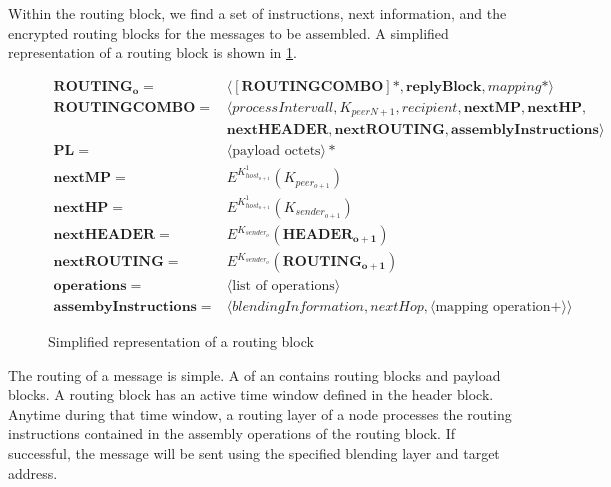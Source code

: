 Within the routing block, we find a set of instructions, next \VortexNodes{} information, and the encrypted routing blocks for the messages to be assembled. A simplified representation of a routing block is shown in \cref{fig:mathRoutingSimplified}.

\begin{figure}[!ht]
	\begin{align}
		\mathbf{ROUTING_o}           = & \langle [ \mathbf{ROUTINGCOMBO} ] *, \mathbf{replyBlock},mapping* \rangle\\  
		\mathbf{ROUTINGCOMBO}        = & \langle processIntervall, K_{peerN+1}, recipient, \mathbf{nextMP}, \mathbf{nextHP}, \nonumber \\
		& \mathbf{nextHEADER}, \mathbf{nextROUTING}, \mathbf{assemblyInstructions} \rangle\\
		\mathbf{PL}                  = & \langle \text{payload octets} \rangle *\\ 
		\mathbf{nextMP}              = & E^{K^1_{host_{o+1}}} \left( K_{peer_{o+1}} \right)\\
		\mathbf{nextHP}              = & E^{K^1_{host_{o+1}}} \left( K_{sender_{o+1}} \right)\\
		\mathbf{nextHEADER}          = & E^{K_{sender_o}} \left( \mathbf{HEADER_{o+1}} \right)\\
		\mathbf{nextROUTING}         = & E^{K_{sender_o}} \left( \mathbf{ROUTING_{o+1}} \right)\\    
		\mathbf{operations}          = & \langle \text{list of operations} \rangle \\
		\mathbf{assembyInstructions} = & \langle  blendingInformation, nextHop, \langle \text{mapping operation} +\rangle \rangle
	\end{align}
	\caption{Simplified representation of a routing block}
	\label{fig:mathRoutingSimplified}
\end{figure}

The routing of a message is simple. A  of an  contains routing blocks and payload blocks. A routing block has an active time window defined in the header block. Anytime during that time window, a routing layer of a node processes the routing instructions contained in the assembly operations of the routing block. If successful, the message will be sent using the specified blending layer and target address.

